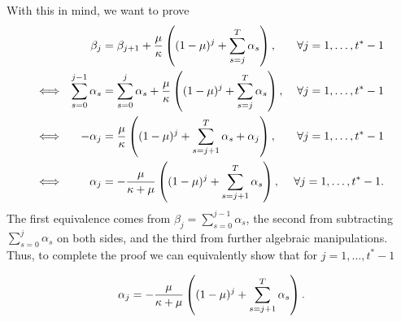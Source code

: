         With this in mind, we want to prove
        \begin{align*}
            & & \quad \beta_{j} &= \beta_{j+1} + \frac{\mu}{\kappa} \left( (1-\mu)^j + \sum_{s=j}^T \alpha_s \right), & \forall j = 1, \ldots, t^*-1\\
            \Longleftrightarrow & & \sum_{s=0}^{j-1} \alpha_s &= \sum_{s=0}^{j} \alpha_s + \frac{\mu}{\kappa} \left( (1-\mu)^j + \sum_{s=j}^T \alpha_s \right), & \forall j = 1, \ldots, t^*-1\\
            \Longleftrightarrow & & -\alpha_j &= \frac{\mu}{\kappa} \left( (1-\mu)^j + \sum_{s=j+1}^T \alpha_s + \alpha_j \right), & \forall j = 1, \ldots, t^*-1\\
            \Longleftrightarrow & & \alpha_j &= -\frac{\mu}{\kappa +\mu} \left( (1-\mu)^j + \sum_{s=j+1}^T \alpha_s \right), & \forall j = 1, \ldots, t^*-1.
        \end{align*}
        The first equivalence comes from $\beta_j = \sum_{s=0}^{j-1} \alpha_s$, the second from subtracting $\sum_{s=0}^{j} \alpha_s$ on both sides, and the third from further algebraic manipulations. Thus, to complete the proof we can equivalently show that for $j = 1, \ldots, t^*-1$

    \begin{equation}
        \label{eqn: AdvTheoremAlphaRecurrence}
        \alpha_j = -\frac{\prob}{\market+\prob} \left( (1-\prob)^j + \sum_{s=j+1}^T \alpha_s \right).%
    \end{equation}

